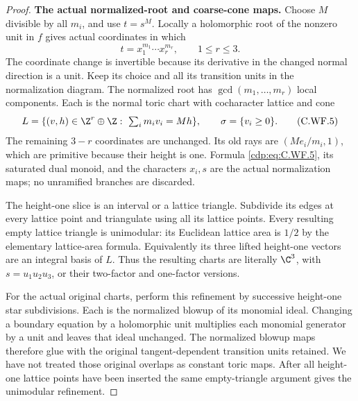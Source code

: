\begin{proof}
\par\medskip\noindent\textbf{The actual normalized-root and coarse-cone maps.}
Choose \(M\) divisible by all \(m_i\), and use \(t=s^M\).
Locally a holomorphic root of the nonzero unit in \(f\) gives
actual coordinates in which
\[
 t=x_1^{m_1}\cdots x_r^{m_r},\qquad 1\le r\le3.
\tag{C.WF.4}\label{cdp:eq:C.WF.4}
\]
The coordinate change is invertible because its derivative in
the changed normal direction is a unit.  Keep its choice and
all its transition units in the normalization diagram.
The normalized root has \(\gcd(m_1,\ldots,m_r)\) local components.
Each is the normal toric chart with cocharacter lattice and cone
\[
 L=\{(v,h)\in\Z^r\oplus\Z:\ \textstyle\sum_i m_iv_i=Mh\},
 \qquad \sigma=\{v_i\ge0\}.
\tag{C.WF.5}\label{cdp:eq:C.WF.5}
\]
The remaining \(3-r\) coordinates are unchanged.  Its old rays
are \((M e_i/m_i,1)\), which are primitive because their height
is one.  Formula \eqref{cdp:eq:C.WF.5}, its saturated dual monoid, and the
characters \(x_i,s\) are the actual normalization maps; no
unramified branches are discarded.

The height-one slice is an interval or a lattice triangle.
Subdivide its edges at every lattice point and triangulate
using all its lattice points.  Every resulting empty lattice
triangle is unimodular: its Euclidean lattice area is \(1/2\)
by the elementary lattice-area formula.  Equivalently its
three lifted height-one vectors are an integral basis of \(L\).
Thus the resulting charts are literally
\(\C^3\), with \(s=u_1u_2u_3\), or their two-factor and
one-factor versions.

For the actual original charts, perform this refinement by
successive height-one star subdivisions.  Each is the normalized
blowup of its monomial ideal.  Changing a boundary equation by a
holomorphic unit multiplies each monomial generator by a unit
and leaves that ideal unchanged.  The normalized blowup maps
therefore glue with the original tangent-dependent transition
units retained.  We have not treated those original overlaps
as constant toric maps.  After all height-one lattice points
have been inserted the same empty-triangle argument gives the
unimodular refinement.


\end{proof}

